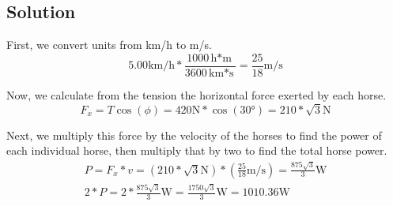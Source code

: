 \documentclass[12pt]{article}
\begin{document}
\subsection*{Solution}
First, we convert units from km/h to m/s. 
\[ 5.00 \unit{\kilo\meter/\hour} * \frac{1000 \unit{\hour*\meter}}{3600 \unit{\kilo\meter*\second}} = \frac{25}{18} \unit{\meter/\second} \]

Now, we calculate from the tension the horizontal force exerted by each horse.
\[ F_x = T\cos(\phi) = 420\unit{\newton} * \cos(30\unit{\degree}) = 210*\sqrt{3}\unit{\newton} \]

Next, we multiply this force by the velocity of the horses to find the power of each individual horse, then multiply that by two to find the total horse power.
\begin{eqnarray*}
    P = F_x*v = (210*\sqrt{3}\unit{\newton}) * (\frac{25}{18} \unit{\meter/\second}) = \frac{875\sqrt{3}}{3} \unit{\watt}\\
    2*P = 2*\frac{875\sqrt{3}}{3} \unit{\watt} = \frac{1750\sqrt{3}}{3} \unit{\watt} = \boxed{1010.36 \unit{\watt}}
\end{eqnarray*}






\end{document}
